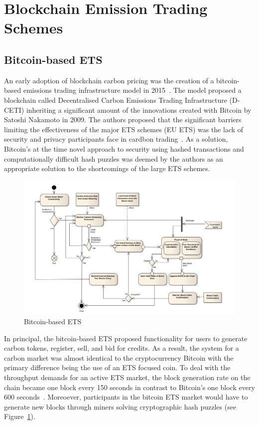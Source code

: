 \section{Blockchain Emission Trading Schemes}
\subsection{Bitcoin-based ETS}
An early adoption of blockchain carbon pricing was the
creation of a bitcoin-based emissions trading infrastructure model
in 2015~\cite{vic15}. The model proposed a blockchain called
Decentralised Carbon Emissions Trading Infrastructure (D-CETI)
inheriting a significant amount of the innovations created with
Bitcoin by Satoshi Nakamoto in 2009. The authors proposed that
the significant barriers limiting the effectiveness of the
major ETS schemes (EU ETS) was the lack of security and privacy
participants face in cardbon trading~\cite{vic15}. As a solution,
Bitcoin's at the time novel approach to security using hashed
transactions and computationally difficult hash puzzles was deemed by the
authors as an appropriate solution to the shortcomings of
the large ETS schemes.


\begin{figure}[H]
    \centering
    \includegraphics[scale=0.38]{photos/bitcoin.png}
    \caption{Bitcoin-based ETS}
    \label{fig:btc}
\end{figure}

In principal, the bitcoin-based ETS proposed functionality for
users to generate carbon tokens, register, sell,
and bid for credits. As a result, the system for a carbon market
was almost identical to the cryptocurrency Bitcoin with the
primary difference being the use of an ETS focused coin.
To deal with the throughput demands for an active ETS market,
the block generation rate on the chain became one block
every 150 seconds in contrast to Bitcoin's one block every
600 seconds~\cite{vic15}. Moreoever, participants in the bitcoin ETS market
would have to generate new blocks through miners solving cryptographic hash
puzzles (see Figure~\ref{fig:btc}).

